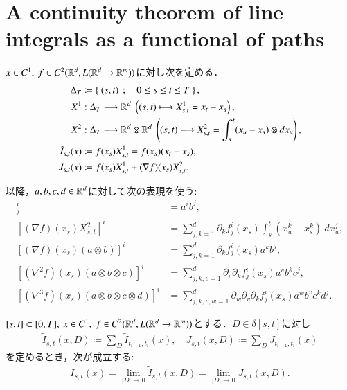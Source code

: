 \section{A continuity theorem of line integrals as a functional of paths}
	\begin{screen}
		\begin{dfn}[記号の定義]
			$x \in C^1,\ f \in C^2(\mathbb{R}^d,L(\mathbb{R}^d \rightarrow \mathbb{R}^m))$に対し次を定める．
			\begin{align}
				\Delta_T &\coloneqq \Set{(s,t)}{0 \leq s \leq t \leq T}, \\
				X^1 &:\Delta_T \longrightarrow \R^d\ \left( (s,t) \longmapsto X^1_{s,t} = x_t - x_s \right), \\
				X^2 &:\Delta_T \longrightarrow \R^d \otimes \R^d\ \left( (s,t) \longmapsto X^2_{s,t} = \int_s^t (x_u - x_s) \otimes dx_u \right), \\
				\tilde{I}_{s,t}(x) &\coloneqq f(x_s)X^1_{s,t} = f(x_s)(x_t - x_s), \\
				J_{s,t}(x) &\coloneqq f(x_s)X^1_{s,t} + (\nabla f)(x_s)X^2_{s,t}.
			\end{align}
		\end{dfn}
	\end{screen}
	
	以降，$a,b,c,d \in \mathbb{R}^d$に対して次の表現を使う:
	\begin{align}
		[a \otimes b]^i_j &= a^i b^j, \\
		\left[ (\nabla f)(x_s)X^2_{s,t} \right]^i &= \sum_{j,k=1}^d \partial_k f^i_j(x_s) \int_s^t \left(x^k_u - x^k_s \right)\ dx^j_u,\\
		\left[ (\nabla f)(x_s)(a \otimes b) \right]^i &= \sum_{j,k=1}^d \partial_k f^i_j(x_s) a^k b^j,\\
		\left[ (\nabla^2 f)(x_s)(a \otimes b \otimes c) \right]^i &= \sum_{j,k,v=1}^d \partial_v \partial_k f^i_j(x_s) a^v b^k c^j,\\
		\left[ (\nabla^3 f)(x_s)(a \otimes b \otimes c \otimes d) \right]^i &= \sum_{j,k,v,w=1}^d \partial_w \partial_v \partial_k f^i_j(x_s) a^w b^v c^k d^j.
	\end{align}
	
	\begin{screen}
		\begin{thm}\label{thm:Riemann_Stieltjes_approximation}
			$[s,t] \subset [0,T],\ x \in C^1,\ f \in C^2(\mathbb{R}^d,L(\mathbb{R}^d \rightarrow \mathbb{R}^m))$とする．$D \in \delta[s,t]$に対し
			\begin{align}
				\tilde{I}_{s,t}(x,D) \coloneqq \sum_D \tilde{I}_{t_{i-1},t_i}(x),
				\quad J_{s,t}(x,D) \coloneqq \sum_D J_{t_{i-1},t_i}(x)
			\end{align}
			を定めるとき，次が成立する:
			\begin{align}
				I_{s,t}(x) = \lim_{|D| \to 0} \tilde{I}_{s,t}(x,D)
				= \lim_{|D| \to 0} J_{s,t}(x,D).
			\end{align}
		\end{thm}
	\end{screen}
	
